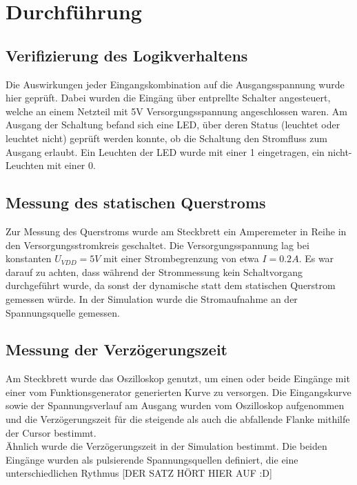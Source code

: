\documentclass[11pt, a4paper]{article}
\begin{document}
\section*{Durchführung}

\subsection*{Verifizierung des Logikverhaltens}

Die Auswirkungen jeder Eingangskombination auf die Ausgangsspannung wurde hier geprüft. Dabei wurden die Eingäng über entprellte Schalter angesteuert, welche an einem Netzteil mit 5V Versorgungsspannung angeschlossen waren. Am Ausgang der Schaltung befand sich eine LED, über deren Status (leuchtet oder leuchtet nicht) geprüft werden konnte, ob die Schaltung den Stromfluss zum Ausgang erlaubt. Ein Leuchten der LED wurde mit einer 1 eingetragen, ein nicht-Leuchten mit einer 0.

\subsection*{Messung des statischen Querstroms}

Zur Messung des Querstroms wurde am Steckbrett ein Amperemeter in Reihe in den Versorgungsstromkreis geschaltet.
Die Versorgungsspannung lag bei konstanten $U_{VDD} = 5V$ mit einer Strombegrenzung von etwa $I = 0.2A$. Es war darauf zu achten, dass während der Strommessung kein Schaltvorgang durchgeführt wurde, da sonst der dynamische statt dem statischen Querstrom gemessen würde.
In der Simulation wurde die Stromaufnahme an der Spannungsquelle gemessen. 

\subsection*{Messung der Verzögerungszeit}

Am Steckbrett wurde das Oszilloskop genutzt, um einen oder beide Eingänge mit einer vom Funktionsgenerator generierten Kurve zu versorgen. Die Eingangskurve sowie der Spannungsverlauf am Ausgang wurden vom Oszilloskop aufgenommen und die Verzögerungszeit für die steigende als auch die abfallende Flanke mithilfe der Cursor bestimmt. \\

Ähnlich wurde die Verzögerungszeit in der Simulation bestimmt. Die beiden Eingänge wurden als pulsierende Spannungsquellen definiert, die eine unterschiedlichen Rythmus [DER SATZ HÖRT HIER AUF :D]
\end{document}
